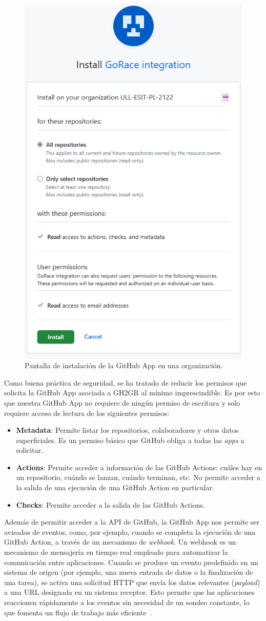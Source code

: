 \begin{figure}
    \centering
    \includegraphics[width=0.4\linewidth]{images/install-screen.png}
    \caption{Pantalla de instalación de la GitHub App en una organización.}\label{fig:auth}
\end{figure}

Como buena práctica de seguridad, se ha tratado de reducir los permisos que solicita la GitHub App asociada a GH2GR al mínimo imprescindible. Es por esto que nuestra GitHub App no requiere de ningún permiso de escritura y solo requiere acceso de lectura de los siguientes permisos:
\begin{itemize}
    \item \textbf{Metadata}: Permite listar los repositorios, colaboradores y otros datos superficiales. Es un permiso básico que GitHub obliga a todas las \textit{apps} a solicitar.
    \item \textbf{Actions}: Permite acceder a información de las GitHub Actions: cuáles hay en un repositorio, cuándo se lanzan, cuándo terminan, etc. No permite acceder a la salida de una ejecución de una GitHub Action en particular.
    \item \textbf{Checks}: Permite acceder a la salida de las GitHub Actions.
\end{itemize}

Además de permitir acceder a la API de GitHub, la GitHub App nos permite ser avisados de eventos, como, por ejemplo, cuando se completa la ejecución de una GitHub Action, a través de un mecanismo de \textit{webhook}. Un webhook es un mecanismo de mensajería en tiempo real empleado para automatizar la comunicación entre aplicaciones. Cuando se produce un evento predefinido en un sistema de origen (por ejemplo, una nueva entrada de datos o la finalización de una tarea), se activa una solicitud \acrshort{HTTP} que envía los datos relevantes (\textit{payload}) a una \acrshort{URL} designada en un sistema receptor. Esto permite que las aplicaciones reaccionen rápidamente a los eventos sin necesidad de un sondeo constante, lo que fomenta un flujo de trabajo más eficiente~\cite{redhatWhatWebhook}.

